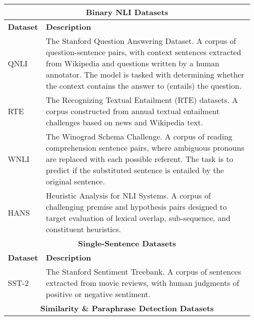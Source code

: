 \begin{table*}[h!]
\centering
\begin{tabular}{p{}p{}}
  \toprule
  \multicolumn{2}{c}{\textbf{Binary NLI Datasets}} \\
  \midrule
  \textbf{Dataset} & \textbf{Description} \\
  \midrule
  QNLI \citep{wang-etal-2018-glue} & The Stanford Question Answering Dataset. A corpus of question-sentence pairs, with context sentences extracted from Wikipedia and questions written by a human annotator. The model is tasked with determining whether the context contains the answer to (entails) the question. \\
  \midrule
  RTE \tablefootnote{\citep{dagan2006pascal, bar2006second, giampiccolo2007third, bentivogli2009fifth}} & The Recognizing Textual Entailment (RTE) datasets. A corpus constructed from annual textual entailment challenges based on news and Wikipedia text.\\
  \midrule
  WNLI \citep{levesque2011winograd} & The Winograd Schema Challenge. A corpus of reading comprehension sentence pairs, where ambiguous pronouns are replaced with each possible referent. The task is to predict if the substituted sentence is entailed by the original sentence.\\
  \midrule
  HANS \citep{DBLP:journals/corr/abs-1902-01007} & Heuristic Analysis for NLI Systems. A corpus of challenging premise and hypothesis pairs designed to target evaluation of lexical overlap, sub-sequence, and constituent heuristics. \\
  \midrule
  \multicolumn{2}{c}{\textbf{Single-Sentence Datasets}} \\
  \midrule
  \textbf{Dataset} & \textbf{Description} \\
  \midrule
  SST-2 \citep{socher2013recursive} & The Stanford Sentiment Treebank. A corpus of sentences extracted from movie reviews, with human judgments of positive or negative sentiment. \\
  \midrule
  \multicolumn{2}{c}{\textbf{Similarity \& Paraphrase Detection Datasets}} \\

\end{tabular}
\end{table*}
